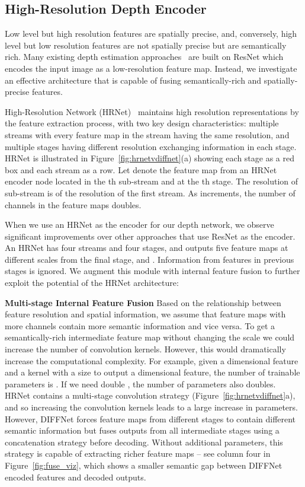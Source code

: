 \documentclass{bmvc2k}
\begin{document}
\subsection{High-Resolution Depth Encoder}\label{sec:encoder}
Low level but high resolution features are spatially precise, and, conversely, high level but low resolution features are not spatially precise but are semantically rich. Many existing depth estimation approaches~\cite{monodepth2} are built on ResNet which encodes the input image as a low-resolution feature map. Instead, we investigate an effective architecture that is capable of fusing semantically-rich and spatially-precise features.

High-Resolution Network (HRNet)~\cite{hrnet2020} maintains high resolution representations by the feature extraction process, with two key design characteristics: 
multiple streams with every feature map in the stream having the same resolution, and multiple stages having different resolution exchanging information in each stage. 
HRNet is illustrated in Figure~\ref{fig:hrnetvdiffnet}(a) showing each stage as a red box and each stream as a row. Let  denote the feature map from an HRNet encoder node located in the th sub-stream and at the th stage. The resolution of sub-stream  is  of the resolution of the first stream. As  increments, the number of channels in the feature maps doubles.  

When we use an HRNet as the encoder for our depth network, we observe significant improvements over other approaches that use ResNet as the encoder.
An HRNet has four streams and four stages, and outputs five feature maps at different scales from the final stage, 
 and . Information from features in previous stages is ignored. We augment this module with internal feature fusion to further exploit the potential of the HRNet architecture:

\noindent\textbf{Multi-stage Internal Feature Fusion} Based on the relationship between feature resolution and spatial information, we assume that feature maps with more channels contain more semantic information and vice versa. To get a semantically-rich intermediate feature map without changing the scale we could increase the number of convolution kernels. However, this would dramatically increase the computational complexity. For example, given a  dimensional feature and a kernel with a size  to output a  dimensional feature, the number of trainable parameters is . If we need double , the number of parameters also doubles. HRNet contains a multi-stage convolution strategy (Figure~\ref{fig:hrnetvdiffnet}a), and so increasing the convolution kernels leads to a large increase in parameters.
However, DIFFNet forces feature maps from different stages to contain different semantic information but fuses outputs from all intermediate stages using a concatenation strategy before decoding.
Without additional parameters, this strategy is capable of extracting richer feature maps -- see column four in Figure~\ref{fig:fuse_viz}, which shows a smaller semantic gap between DIFFNet encoded features and decoded outputs. 
\end{document}

